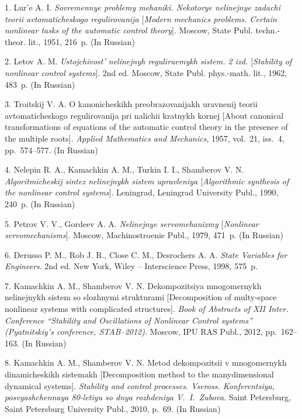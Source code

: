 

{\footnotesize

\vskip 3mm


\vskip 2.5mm

1. Lur'e A. I. {\it Sovremennye problemy mehaniki. Nekotorye
nelinejnye zadachi teorii avtomaticheskogo regulirovanija
$[$Modern mechanics problems. Certain nonlinear tasks of the
automatic control theory$]$}. Moscow, State Publ. techn.-theor.
lit., 1951, 216~p. (In Russian)

2. Letov A. M. {\it Ustojchivost' nelinejnyh reguliruemykh sistem.
2 izd. $[$Stability of nonlinear control systems$]$}. 2nd ed.
Moscow, State Publ. phys.-math. lit., 1962, 483~p. (In Russian)

3. Troitskij V. A. O kanonicheskikh preobrazovanijakh uravnenij
teorii avtomaticheskogo regulirovanija pri nalichii kratnykh
kornej [About canonical transformations of equations of the
automatic control theory in the presence of the multiple roots].
{\it Applied Mathematics and Mechanics}, 1957, vol.~21, iss.~4,
pp.~574--577. (In Russian)

4. Nelepin R. A., Kamachkin A. M., Turkin I. I., Shamberov V. N.
{\it Algoritmicheskij sintez  nelinejnykh sistem upravleniya
$[$Algorithmic synthesis of the nonlinear control systems$]$}.
Leningrad, Leningrad University Publ., 1990, 240~p. (In Russian)

5. Petrov V. V., Gordeev A. A. {\it Nelinejnye servomehanizmy
$[$Nonlinear servomechanisms$]$}. Moscow, Machinostroenie Publ.,
1979, 471~p. (In Russian)

6. Derusso P. M., Rob J. R., Close C. M., Desrochers A. A.  {\it
State Variables for Engineers}. 2nd ed. New York, Wiley --
Interscience Press, 1998, 575~p.

7. Kamachkin A. M., Shamberov V. N. Dekompozitsiya mnogomernykh
nelinejnykh sistem so slozhnymi strukturami [Decomposition of
multy-space nonlinear systems with complicated structures]. {\it
Book of Abstracts of XII Inter. Conference ``Stability and
Oscillations of Nonlinear Control systems'' (Pyatnitskiy's
conference, STAB--2012)}. Moscow, IPU RAS Publ., 2012,
pp.~162--163. (In Russian)

8. Kamachkin A. M., Shamberov V. N. Metod dekompozitsii v
mnogomernykh dinamicheskikh sistemakh [Decomposition method to the
manydimensional dynamical systems]. {\it Stability and control
processes. Vseross. Konferentsiya, posvyashchennaya 80-letiyu so
dnya rozhdeniya V.~I.~Zubova}. Saint Petersburg, Saint Petersburg
University Publ., 2010, p.~69. (In Russian)

}
